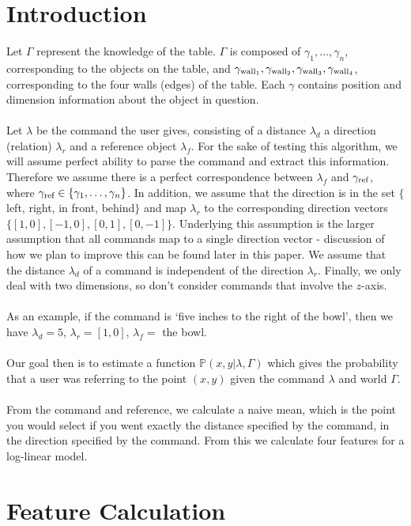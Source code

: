 \documentclass[12pt,letterpaper]{article}
\newcommand\refobj{\textmd{ref}}
\begin{document}
\section*{Introduction}
Let $\Gamma$ represent the knowledge of the table. $\Gamma$ is composed of $\gamma_1, \ldots, \gamma_n$, corresponding to the objects on the table, and $\gamma_{\textmd{wall}_1}, \gamma_{\textmd{wall}_2}, \gamma_{\textmd{wall}_3}, \gamma_{\textmd{wall}_4}$, corresponding to the four walls (edges) of the table. Each $\gamma$ contains position and dimension information about the object in question.   \\
\\
Let $\lambda$ be the command the user gives, consisting of a distance $\lambda_d$ a direction (relation) $\lambda_r$ and a reference object $\lambda_f$. For the sake of testing this algorithm, we will assume perfect ability to parse the command and extract this information. Therefore we assume there is a perfect correspondence between $\lambda_f$ and $\gamma_\refobj$, where $\gamma_\refobj \in \{\gamma_1, \ldots, \gamma_n\}$. In addition, we assume that the direction is in the set $\{$left, right, in front, behind$\}$ and map $\lambda_r$ to the corresponding direction vectors $\{[1, 0], [-1, 0], [0, 1], [0, -1]\}$.  Underlying this assumption is the larger assumption that all commands map to a single direction vector - discussion of how we plan to improve this can be found later in this paper. We assume that the distance $\lambda_d$ of a command is independent of the direction $\lambda_r$. Finally, we only deal with two dimensions, so don't consider commands that involve the $z$-axis. \\
\\
As an example, if the command is `five inches to the right of the bowl', then we have $\lambda_d = 5$, $\lambda_r = [1, 0]$, $\lambda_f = $ the bowl. \\
\\
Our goal then is to estimate a function $\mathbb{P}(x, y | \lambda, \Gamma)$ which gives the probability that a user was referring to the point $(x, y)$ given the command $\lambda$ and world $\Gamma$. \\
\\
From the command and reference, we calculate a naive mean, which is the point you would select if you went exactly the distance specified by the command, in the direction specified by the command. From this we calculate four features for a log-linear model. 

\section*{Feature Calculation}
\end{document}
